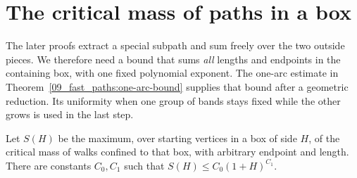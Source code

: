 \section{The critical mass of paths in a box}\label{sec:full-box}
The later proofs extract a special subpath and sum freely over the two
outside pieces. We therefore need a bound that sums \emph{all} lengths
and endpoints in the containing box, with one fixed polynomial exponent.
The one-arc estimate in Theorem~\ref{09_fast_paths:one-arc-bound} supplies
that bound after a geometric reduction. Its uniformity when one group of
bands stays fixed while the other grows is used in the last step.

\begin{proposition}\label{09_fast_paths:full-box}
Let \(S(H)\) be the maximum, over starting vertices in a box of side
\(H\), of the critical mass of walks confined to that box, with
arbitrary endpoint and length. There are constants \(C_0,C_1\) such
that \(S(H)\le C_0(1+H)^{C_1}\).
\end{proposition}
